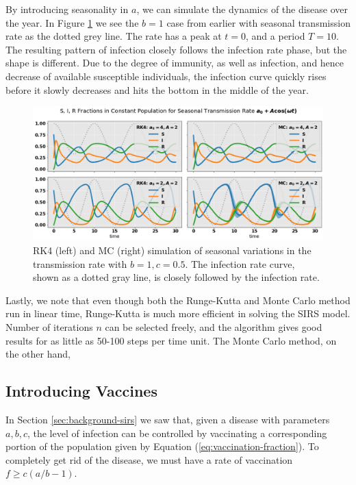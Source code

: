 \documentclass[]{article}
\begin{document}
By introducing seasonality in $a$, we can simulate the dynamics of the disease over the year. In Figure \ref{fig:seasonal-transmission-rate} we see the $b=1$ case from earlier with seasonal transmission rate as the dotted grey line. The rate has a peak at $t=0$, and a period $T=10$. The resulting pattern of infection closely follows the infection rate phase, but the shape is different. Due to the degree of immunity, as well as infection, and hence decrease of available susceptible individuals, the infection curve quickly rises before it slowly decreases and hits the bottom in the middle of the year.

\begin{figure}[!h]
	\centering
	\includegraphics[width=1\linewidth]{./figs/seasonal-transmission-rate.png}
	\caption{RK4 (left) and MC (right) simulation of seasonal variations in the transmission rate with $b=1, c=0.5$. The infection rate curve, shown as a dotted gray line, is closely followed by the infection rate.}
	\label{fig:seasonal-transmission-rate}
\end{figure}

Lastly, we note that even though both the Runge-Kutta and Monte Carlo method run in linear time, Runge-Kutta is much more efficient in solving the SIRS model. Number of iterations $n$ can be selected freely, and the algorithm gives good results for as little as 50-100 steps per time unit. The Monte Carlo method, on the other hand, 


\subsection{Introducing Vaccines} \label{sec:vaccines}

In Section \ref{sec:background-sirs} we saw that, given a disease with parameters $a,b,c$, the level of infection can be controlled by vaccinating a corresponding portion of the population given by Equation (\ref{eq:vaccination-fraction}). To completely get rid of the disease, we must have a rate of vaccination $f \ge c(a/b - 1)$.
\end{document}
